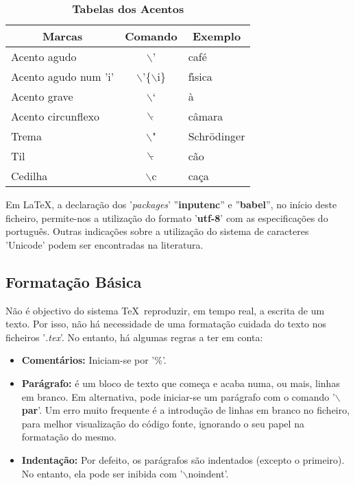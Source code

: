 \documentclass[a4paper,12pt]{article}
\begin{document}
\begin{table}[h]
\label{TabAcentos}
\caption{\bf Tabelas dos Acentos}
\begin{center}
\begin{tabular}{l|c|l}  \hline
\multicolumn{1}{c}{\bf Marcas} & \multicolumn{1}{|c|}{\bf Comando} & 
\multicolumn{1}{c}{\bf Exemplo} \\ \hline
Acento agudo         & $\backslash$'                  & caf\'e        \\ \hline
Acento agudo num 'i' & $\backslash$'\{$\backslash$i\} & f\'{\i}sica   \\ \hline
Acento grave         & $\backslash$`                  & \`a           \\ \hline
Acento circunflexo   & $\backslash\hat{\ }$           & c\^amara      \\ \hline
Trema                & $\backslash$"                  & Schr\"odinger \\ \hline
Til                  & $\backslash\tilde{\ }$         & c\~ao         \\ \hline
Cedilha              & $\backslash$c                  & ca\c{c}a      \\ \hline
\end{tabular}
\end{center}
\end{table}

Em \LaTeX, a declaração dos '{\it packages}' 
''{\bf inputenc}'' e ''{\bf babel}'', 
no início deste ficheiro, permite-nos a utilização do formato '{\bf utf-8}' 
com as especificações do português. Outras indicações sobre a utilização 
do sistema de caracteres 'Unicode' podem ser encontradas na literatura.

\subsection{Formatação Básica}

Não é objectivo do sistema \TeX\ reproduzir, em tempo real, a escrita
de um texto. Por isso, não há necessidade de uma formatação cuidada do texto
nos ficheiros '{\it .tex}'. No entanto, há algumas regras a ter em conta:

\begin{itemize}
\item {\bf Comentários:} Iniciam-se por '\%'.
\item {\bf Parágrafo:} é um bloco de texto
que começa e acaba numa, ou mais, linhas em branco. Em alternativa,
pode iniciar-se um parágrafo com o comando '$\backslash${\bf par}'.
Um erro muito frequente é a introdução de linhas em branco
no ficheiro, para melhor visualização do código fonte, ignorando o
seu papel na formatação do mesmo.
\item {\bf Indentação:} 
Por defeito, os parágrafos são 
indentados (excepto o primeiro). No entanto, ela pode ser 
inibida com '$\backslash$noindent'.
\end{itemize}
\end{document}
